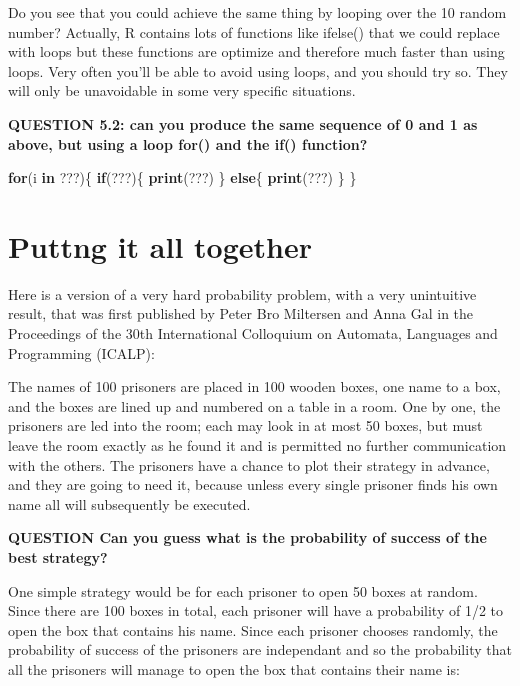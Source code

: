 \documentclass[]{book}
\newenvironment{Shaded}{\begin{snugshade}}{\end{snugshade}}
\newcommand{\ControlFlowTok}[1]{\textcolor[rgb]{0.13,0.29,0.53}{\textbf{#1}}}
\newcommand{\KeywordTok}[1]{\textcolor[rgb]{0.13,0.29,0.53}{\textbf{#1}}}
\newcommand{\NormalTok}[1]{#1}
\begin{document}
Do you see that you could achieve the same thing by looping over the 10 random number? Actually, R contains lots of functions like ifelse() that we could replace with loops but these functions are optimize and therefore much faster than using loops. Very often you'll be able to avoid using loops, and you should try so. They will only be unavoidable in some very specific situations.

\textbf{QUESTION 5.2: can you produce the same sequence of 0 and 1 as above, but using a loop for() and the if() function?}

\begin{Shaded}
\begin{Highlighting}[]
\ControlFlowTok{for}\NormalTok{(i }\ControlFlowTok{in}\NormalTok{ ???)\{}
  \ControlFlowTok{if}\NormalTok{(???)\{}
    \KeywordTok{print}\NormalTok{(???)}
\NormalTok{  \}}
  \ControlFlowTok{else}\NormalTok{\{}
    \KeywordTok{print}\NormalTok{(???)}
\NormalTok{  \}}
\NormalTok{\}}
\end{Highlighting}
\end{Shaded}

\hypertarget{puttng-it-all-together}{%
\section{Puttng it all together}\label{puttng-it-all-together}}

Here is a version of a very hard probability problem, with a very unintuitive result, that was first published by Peter Bro Miltersen and Anna Gal in the Proceedings of the 30th International Colloquium on Automata, Languages and Programming (ICALP):

The names of 100 prisoners are placed in 100 wooden boxes, one name to a box, and the boxes are lined up and numbered on a table in a room.
One by one, the prisoners are led into the room; each may look in at most 50 boxes, but must leave the room exactly as he found it and is permitted no further communication with the others.
The prisoners have a chance to plot their strategy in advance, and they are going to need it, because unless every single prisoner finds his own name all will subsequently be executed.

\textbf{QUESTION Can you guess what is the probability of success of the best strategy?}

One simple strategy would be for each prisoner to open 50 boxes at random. Since there are 100 boxes in total, each prisoner will have a probability of 1/2 to open the box that contains his name. Since each prisoner chooses randomly, the probability of success of the prisoners are independant and so the probability that all the prisoners will manage to open the box that contains their name is:
\end{document}
